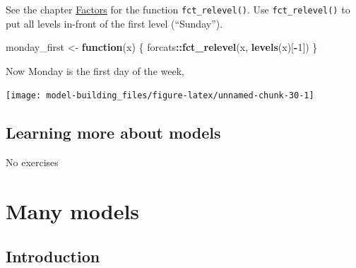 \documentclass[]{book}
\newenvironment{Shaded}{\begin{snugshade}}{\end{snugshade}}
\newcommand{\ControlFlowTok}[1]{\textcolor[rgb]{0.13,0.29,0.53}{\textbf{#1}}}
\newcommand{\DataTypeTok}[1]{\textcolor[rgb]{0.13,0.29,0.53}{#1}}
\newcommand{\DecValTok}[1]{\textcolor[rgb]{0.00,0.00,0.81}{#1}}
\newcommand{\KeywordTok}[1]{\textcolor[rgb]{0.13,0.29,0.53}{\textbf{#1}}}
\newcommand{\NormalTok}[1]{#1}
\newcommand{\OperatorTok}[1]{\textcolor[rgb]{0.81,0.36,0.00}{\textbf{#1}}}
\newcommand{\OtherTok}[1]{\textcolor[rgb]{0.56,0.35,0.01}{#1}}
\newcommand{\StringTok}[1]{\textcolor[rgb]{0.31,0.60,0.02}{#1}}
\theoremstyle{plain}
\theoremstyle{remark}
\begin{document}
See the chapter \href{http://r4ds.had.co.nz/factors.html}{Factors} for the function \texttt{fct\_relevel()}.
Use \texttt{fct\_relevel()} to put all levels in-front of the first level (``Sunday'').

\begin{Shaded}
\begin{Highlighting}[]
\NormalTok{monday_first <-}\StringTok{ }\ControlFlowTok{function}\NormalTok{(x) \{}
\NormalTok{  forcats}\OperatorTok{::}\KeywordTok{fct_relevel}\NormalTok{(x, }\KeywordTok{levels}\NormalTok{(x)[}\OperatorTok{-}\DecValTok{1}\NormalTok{])  }
\NormalTok{\}}
\end{Highlighting}
\end{Shaded}

Now Monday is the first day of the week,

\begin{Shaded}
\end{Shaded}

\begin{center}\texttt{[image: model-building\_files/figure-latex/unnamed-chunk-30-1]} \end{center}

\hypertarget{learning-more-about-models}{%
\section{Learning more about models}\label{learning-more-about-models}}

No exercises

\hypertarget{many-models}{%
\chapter{Many models}\label{many-models}}

\hypertarget{introduction-16}{%
\section{Introduction}\label{introduction-16}}
\end{document}
